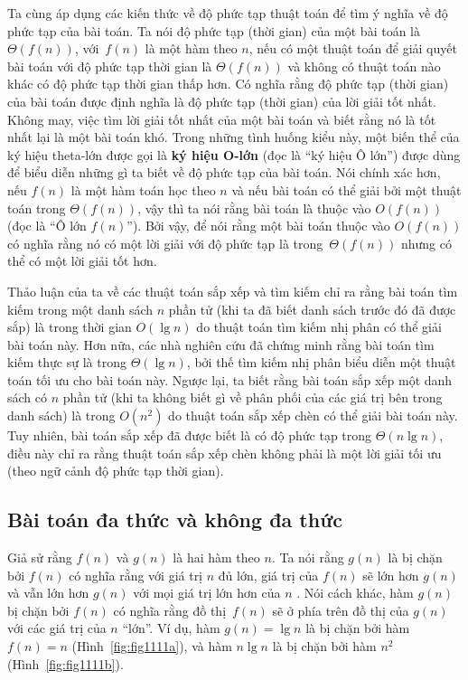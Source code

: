 Ta cùng áp dụng các kiến thức về độ phức tạp thuật toán để tìm ý nghĩa về độ phức tạp của
bài toán. Ta nói độ phức tạp (thời gian) của một bài toán là $\Theta(f(n))$, với~$f(n)$ là
một hàm theo $n$, nếu có một thuật toán để giải quyết bài toán với độ phức tạp thời gian
là $\Theta(f(n))$ và không có thuật toán nào khác có độ phức tạp thời gian thấp hơn. Có
nghĩa rằng độ phức tạp (thời gian) của bài toán được định nghĩa là độ phức tạp (thời gian)
của lời giải tốt nhất. Không may, việc tìm lời giải tốt nhất của một bài toán và biết rằng
nó là tốt nhất lại là một bài toán khó. Trong những tình huống kiểu này, một biến thể của
ký hiệu theta-lớn được gọi là \textbf{ký hiệu O-lớn} (đọc là ``ký hiệu Ô lớn'') được dùng
để biểu diễn những gì ta biết về độ phức tạp của bài toán. Nói chính xác hơn, nếu $f(n)$
là một hàm toán học theo $n$ và nếu bài toán có thể giải bởi một thuật toán trong
$\Theta(f(n))$, vậy thì ta nói rằng bài toán là thuộc vào $O(f(n))$ (đọc là ``Ô lớn
$f(n)$''). Bởi vậy, để nói rằng một bài toán thuộc vào $O(f(n))$ có nghĩa rằng nó có một
lời giải với độ phức tạp là trong~$\Theta(f(n))$ nhưng có thể có một lời giải tốt hơn.

Thảo luận của ta về các thuật toán sắp xếp và tìm kiếm chỉ ra rằng bài toán tìm kiếm trong
một danh sách $n$ phần tử (khi ta đã biết danh sách trước đó đã được sắp) là trong thời
gian $O(\lg n)$ do thuật toán tìm kiếm nhị phân có thể giải bài toán này. Hơn nữa, các nhà
nghiên cứu đã chứng minh rằng bài toán tìm kiếm thực sự là trong $\Theta(\lg n)$, bởi thế
tìm kiếm nhị phân biểu diễn một thuật toán tối ưu cho bài toán này. Ngược lại, ta biết
rằng bài toán sắp xếp một danh sách có $n$ phần tử (khi ta không biết gì về phân phối của
các giá trị bên trong danh sách) là trong $O(n^2)$ do thuật toán sắp xếp chèn có thể giải
bài toán này. Tuy nhiên, bài toán sắp xếp đã được biết là có độ phức tạp trong $\Theta(n
\lg n)$, điều này chỉ ra rằng thuật toán sắp xếp chèn không phải là một lời giải tối ưu
(theo ngữ cảnh độ phức tạp thời gian).

%
\subsection*{Bài toán đa thức và không đa thức}
Giả sử rằng $f(n)$ và $g(n)$ là hai hàm theo $n$. Ta nói rằng $g(n)$ là bị chặn bởi $f(n)$
có nghĩa rằng với giá trị $n$ đủ lớn, giá trị của $f(n)$ sẽ lớn hơn $g(n)$ và vẫn lớn hơn
$g(n)$ với mọi giá trị lớn hơn của $n$ . Nói cách khác, hàm $g(n)$ bị chặn bởi $f(n)$ có
nghĩa rằng đồ thị~$f(n)$ sẽ ở phía trên đồ thị của $g(n)$ với các giá trị của $n$
``lớn''. Ví dụ, hàm $g(n)=\lg n$ là bị chặn bởi hàm $f(n)=n$ (Hình~\ref{fig:fig1111a}), và
hàm $n \lg n$ là bị chặn bởi hàm $n^2$ (Hình~\ref{fig:fig1111b}).

